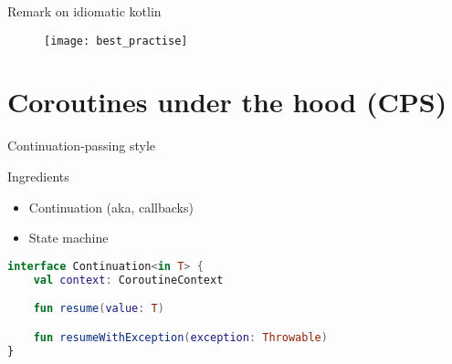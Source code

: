 \documentclass[10pt]{beamer}
\begin{document}
\begin{frame}
	Remark on idiomatic kotlin
	\begin{figure}
		\texttt{[image: best\_practise]}
	\end{figure}
\end{frame}

\section{Coroutines under the hood (CPS)}
\begin{frame}{Continuation-passing style}

Ingredients
	\begin{itemize}
		\item Continuation (aka, callbacks) 
		\item State machine 
	\end{itemize}
\end{frame}
\begin{frame}[fragile]
\begin{lstlisting}[language=Kotlin, basicstyle=\ttfamily]
interface Continuation<in T> {
    val context: CoroutineContext

    fun resume(value: T)

    fun resumeWithException(exception: Throwable)
}
\end{lstlisting}
\end{frame}
\end{document}

